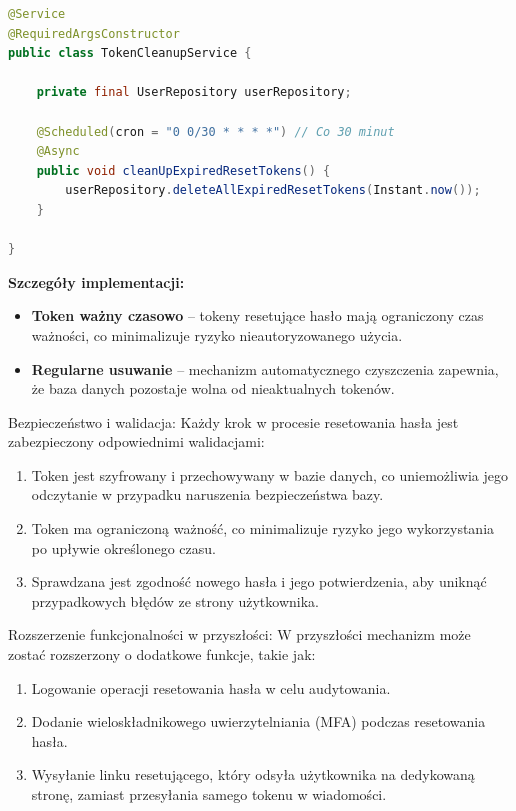 \begin{lstlisting}[language=Java, style=JavaStyle, caption=Usługa czyszczenia wygasłych tokenów \texttt{TokenCleanupService}]
@Service
@RequiredArgsConstructor
public class TokenCleanupService {

    private final UserRepository userRepository;

    @Scheduled(cron = "0 0/30 * * * *") // Co 30 minut
    @Async
    public void cleanUpExpiredResetTokens() {
        userRepository.deleteAllExpiredResetTokens(Instant.now());
    }

}
\end{lstlisting}

\textbf{Szczegóły implementacji:}
\begin{itemize}
    \item \textbf{Token ważny czasowo} -- tokeny resetujące hasło mają ograniczony czas ważności, co minimalizuje ryzyko nieautoryzowanego użycia.
    \item \textbf{Regularne usuwanie} -- mechanizm automatycznego czyszczenia zapewnia, że baza danych pozostaje wolna od nieaktualnych tokenów.
\end{itemize}

Bezpieczeństwo i walidacja:
Każdy krok w procesie resetowania hasła jest zabezpieczony odpowiednimi walidacjami:
\begin{enumerate}
    \item Token jest szyfrowany i przechowywany w bazie danych, co uniemożliwia jego odczytanie w przypadku naruszenia bezpieczeństwa bazy.
    \item Token ma ograniczoną ważność, co minimalizuje ryzyko jego wykorzystania po upływie określonego czasu.
    \item Sprawdzana jest zgodność nowego hasła i jego potwierdzenia, aby uniknąć przypadkowych błędów ze strony użytkownika.
\end{enumerate}

Rozszerzenie funkcjonalności w przyszłości:
W przyszłości mechanizm może zostać rozszerzony o dodatkowe funkcje, takie jak:
\begin{enumerate}
    \item Logowanie operacji resetowania hasła w celu audytowania.
    \item Dodanie wieloskładnikowego uwierzytelniania (MFA) podczas resetowania hasła.
    \item Wysyłanie linku resetującego, który odsyła użytkownika na dedykowaną stronę, zamiast przesyłania samego tokenu w wiadomości.
\end{enumerate}

